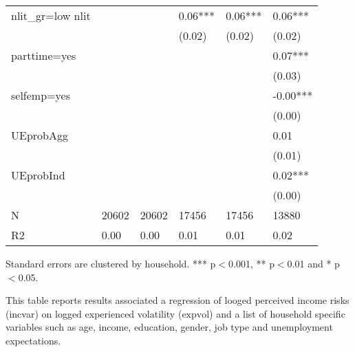 \begin{table}[p]
\begin{adjustbox}{width=\textwidth}
\begin{threeparttable}
\begin{tabular}{llllll}
nlit\_gr=low nlit &          &           &    0.06*** &     0.06*** &      0.06*** \\
                 &          &           &     (0.02) &      (0.02) &       (0.02) \\
parttime=yes     &          &           &            &             &      0.07*** \\
                 &          &           &            &             &       (0.03) \\
selfemp=yes      &          &           &            &             &     -0.00*** \\
                 &          &           &            &             &       (0.00) \\
UEprobAgg        &          &           &            &             &         0.01 \\
                 &          &           &            &             &       (0.01) \\
UEprobInd        &          &           &            &             &      0.02*** \\
                 &          &           &            &             &       (0.00) \\
N                &    20602 &     20602 &      17456 &       17456 &        13880 \\
R2               &     0.00 &      0.00 &       0.01 &        0.01 &         0.02 \\
\bottomrule
\end{tabular}
\begin{tablenotes}\item Standard errors are clustered by household. *** p$<$0.001, ** p$<$0.01 and * p$<$0.05. 
\item This table reports results associated a regression of looged perceived income risks (incvar) on logged experienced volatility ($\text{expvol}$) and a list of household specific variables such as age, income, education, gender, job type and unemployment expectations.
\end{tablenotes}
\end{threeparttable}
\end{adjustbox}
\end{table}